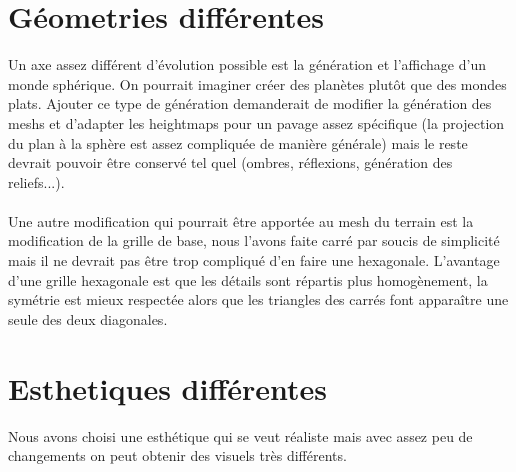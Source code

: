 \documentclass{EPUProjetDi}
\begin{document}
\section{Géometries différentes}

Un axe assez différent d'évolution possible est la génération et l'affichage d'un monde sphérique. On pourrait imaginer créer des planètes plutôt que des mondes plats. Ajouter ce type de génération demanderait de modifier la génération des meshs et d'adapter les heightmaps pour un pavage assez spécifique (la projection du plan à la sphère est assez compliquée de manière générale) mais le reste devrait pouvoir être conservé tel quel (ombres, réflexions, génération des reliefs...).

\paragraph{}
Une autre modification qui pourrait être apportée au mesh du terrain est la modification de la grille de base, nous l'avons faite carré par soucis de simplicité mais il ne devrait pas être trop compliqué d'en faire une hexagonale. L'avantage d'une grille hexagonale est que les détails sont répartis plus homogènement, la symétrie est mieux respectée alors que les triangles des carrés font apparaître une seule des deux diagonales.

\section{Esthetiques différentes}

Nous avons choisi une esthétique qui se veut réaliste mais avec assez peu de changements on peut obtenir des visuels très différents.



\end{document}
